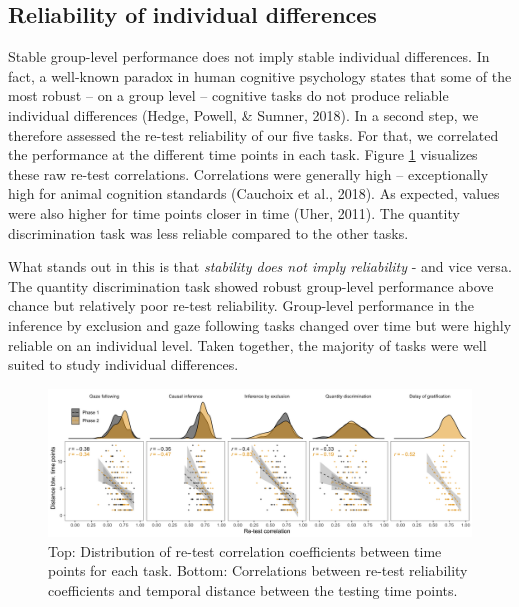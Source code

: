 \documentclass[
  man,floatsintext]{apa6}
\begin{document}
\hypertarget{reliability-of-individual-differences}{%
\subsection{Reliability of individual differences}\label{reliability-of-individual-differences}}

Stable group-level performance does not imply stable individual differences. In fact, a well-known paradox in human cognitive psychology states that some of the most robust -- on a group level -- cognitive tasks do not produce reliable individual differences (Hedge, Powell, \& Sumner, 2018). In a second step, we therefore assessed the re-test reliability of our five tasks. For that, we correlated the performance at the different time points in each task. Figure \ref{fig:relplot} visualizes these raw re-test correlations. Correlations were generally high -- exceptionally high for animal cognition standards (Cauchoix et al., 2018). As expected, values were also higher for time points closer in time (Uher, 2011). The quantity discrimination task was less reliable compared to the other tasks.

What stands out in this is that \emph{stability does not imply reliability} - and vice versa. The quantity discrimination task showed robust group-level performance above chance but relatively poor re-test reliability. Group-level performance in the inference by exclusion and gaze following tasks changed over time but were highly reliable on an individual level. Taken together, the majority of tasks were well suited to study individual differences.

\begin{figure}
\includegraphics[width=1\linewidth]{./figures/reliability} \caption{Top: Distribution of re-test correlation coefficients between time points for each task. Bottom: Correlations between re-test reliability coefficients and temporal distance between the testing time points.}\label{fig:relplot}
\end{figure}
\end{document}
